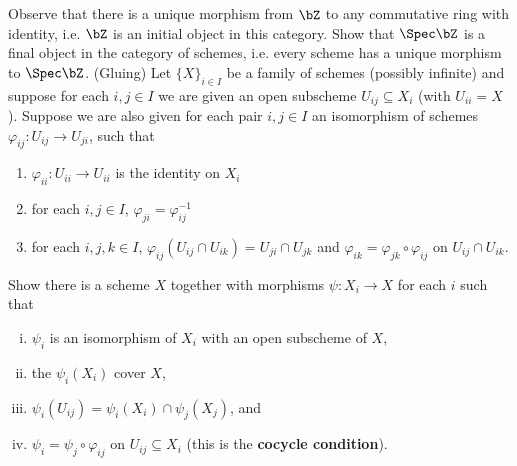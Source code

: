 \begin{homework}[e]
	\prob Observe that there is a unique morphism from $\bZ$ to any commutative ring with identity, i.e. $\bZ$ is an initial object in this category. Show that $\Spec \bZ$ is a final object in the category of schemes, i.e. every scheme has a unique morphism to $\Spec \bZ$.
	\prob (Gluing) Let $\{X\}_{i\in I}$ be a family of schemes (possibly infinite) and suppose for each $i,j \in I$ we are given an open subscheme $U_{ij} \subseteq X_i$ (with $U_{ii} = X$). Suppose we are also given for each pair $i,j \in I$ an isomorphism of schemes $\varphi_{ij}:U_{ij}\to U_{ji}$, such that 
\begin{enumerate}[(1)]
    \item $\varphi_{ii}:U_{ii}\to U_{ii}$ is the identity on $X_i$
    \item for each $i,j \in I$, $\varphi_{ji} = \varphi_{ij}^{-1}$ 
    \item for each $i,j,k \in I$, $\varphi_{ij}(U_{ij} \cap U_{ik}) = U_{ji}\cap U_{jk}$ and $\varphi_{ik} = \varphi_{jk}\circ \varphi_{ij}$ on $U_{ij}\cap U_{ik}$.
\end{enumerate}
Show there is a scheme $X$ together with morphisms $\psi: X_i \to X$ for each $i$ such that
\begin{enumerate}[(i)]
    \item $\psi_i$ is an isomorphism of $X_i$ with an open subscheme of $X$,
    \item the $\psi_i(X_i)$ cover $X$,
    \item $\psi_i(U_{ij}) = \psi_i(X_i) \cap \psi_j(X_j)$, and
    \item $\psi_i = \psi_j \circ \varphi_{ij}$ on $U_{ij} \subseteq X_i$ (this is the \textbf{cocycle condition}).
\end{enumerate}
\end{homework}
\newpage

